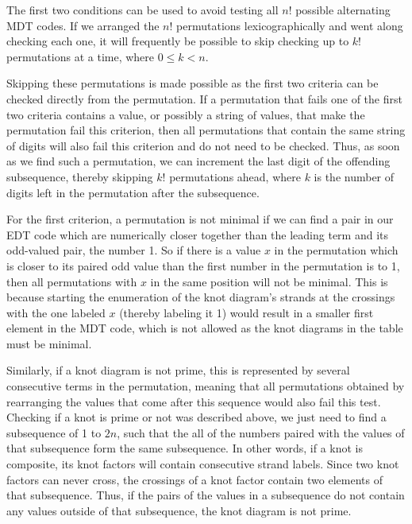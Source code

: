 \begin{paper}

The first two conditions can be used to avoid testing all $n!$ possible
alternating MDT codes.
If we arranged the $n!$ permutations lexicographically and went along checking
each one, it will frequently be possible to skip checking up to $k!$
permutations at a time, where $0\leq k<n$.

Skipping these permutations is made possible as the first two criteria can be
checked directly from the permutation.
If a permutation that fails one of the first two criteria contains a value, or
possibly a string of values, that make the permutation fail this criterion, then
all permutations that contain the same string of digits will also fail this
criterion and do not need to be checked.
Thus, as soon as we find such a permutation, we can increment the last digit of
the offending subsequence, thereby skipping $k!$ permutations ahead, where $k$
is the number of digits left in the permutation after the subsequence.

For the first criterion, a permutation is not minimal if we can find a pair in
our EDT code which are numerically closer together than the leading term and its
odd-valued pair, the number 1.
So if there is a value $x$ in the permutation which is closer to its paired odd
value than the first number in the permutation is to 1, then all permutations
with $x$ in the same position will not be minimal.
This is because starting the enumeration of the knot diagram's strands at the
crossings with the one labeled $x$ (thereby labeling it 1) would result in a
smaller first element in the MDT code, which is not allowed as the knot diagrams
in the table must be minimal.


Similarly, if a knot diagram is not prime, this is represented by several
consecutive terms in the permutation, meaning that all permutations obtained by
rearranging the values that come after this sequence would also fail this test.
Checking if a knot is prime or not was described above, we just need to find a
subsequence of 1 to $2n$, such that the all of the numbers paired with the
values of that subsequence form the same subsequence.
In other words, if a knot is composite, its knot factors will contain
consecutive strand labels.
Since two knot factors can never cross, the crossings of a knot factor contain
two elements of that subsequence.
Thus, if the pairs of the values in a subsequence do not contain any values
outside of that subsequence, the knot diagram is not prime.


\end{paper}
